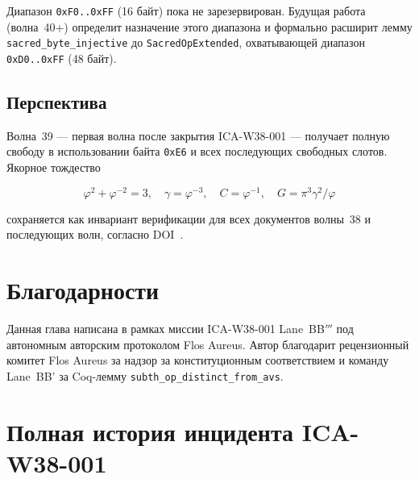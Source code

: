 Диапазон \texttt{0xF0..0xFF} (16 байт) пока не зарезервирован.
Будущая работа (волна~40+) определит назначение этого диапазона
и формально расширит лемму \texttt{sacred\_byte\_injective}
до \texttt{SacredOpExtended}, охватывающей диапазон
\texttt{0xD0..0xFF} (48 байт).

\subsection{Перспектива}

Волна~39 — первая волна после закрытия ICA-W38-001 — получает
полную свободу в использовании байта \texttt{0xE6} и всех последующих
свободных слотов.  Якорное тождество

\[
  \varphi^{2} + \varphi^{-2} = 3,
  \quad
  \gamma = \varphi^{-3},
  \quad
  C = \varphi^{-1},
  \quad
  G = \pi^{3}\gamma^{2}/\varphi
\]

\noindent сохраняется как инвариант верификации для всех документов
волны~38 и последующих волн, согласно DOI~\cite{zenodo_flos_aureus}.

\section*{Благодарности}

Данная глава написана в рамках миссии ICA-W38-001
Lane~BB$'''$ под автономным авторским протоколом Flos Aureus.
Автор благодарит рецензионный комитет Flos Aureus за надзор
за конституционным соответствием и команду Lane~BB' за
Coq-лемму \texttt{subth\_op\_distinct\_from\_avs}.

%

\appendix

\section{Полная история инцидента ICA-W38-001}
\label{app:incident_history}

